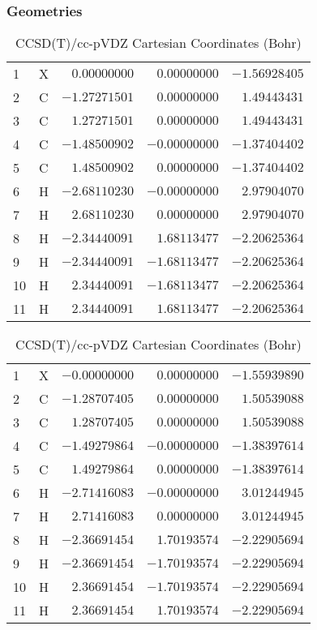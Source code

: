 \documentclass[10pt,oneside]{article}
\begin{document}
\begin{table}[h!]
\subsubsection*{Geometries}
\begin{multicols}{2}
\centering
\caption{CCSD(T)/cc-pVTZ Cartesian Coordinates (Bohr)}
\begin{tabular}{llrrr}
\toprule
1  & X  & $ 0.00000000$ & $ 0.00000000$ & $-1.56928405$ \\
2  & C  & $-1.27271501$ & $ 0.00000000$ & $ 1.49443431$ \\
3  & C  & $ 1.27271501$ & $ 0.00000000$ & $ 1.49443431$ \\
4  & C  & $-1.48500902$ & $-0.00000000$ & $-1.37404402$ \\
5  & C  & $ 1.48500902$ & $ 0.00000000$ & $-1.37404402$ \\
6  & H  & $-2.68110230$ & $-0.00000000$ & $ 2.97904070$ \\
7  & H  & $ 2.68110230$ & $ 0.00000000$ & $ 2.97904070$ \\
8  & H  & $-2.34440091$ & $ 1.68113477$ & $-2.20625364$ \\
9  & H  & $-2.34440091$ & $-1.68113477$ & $-2.20625364$ \\
10 & H  & $ 2.34440091$ & $-1.68113477$ & $-2.20625364$ \\
11 & H  & $ 2.34440091$ & $ 1.68113477$ & $-2.20625364$ \\
\bottomrule
\end{tabular}
\caption{CCSD(T)/cc-pVDZ Cartesian Coordinates (Bohr)}
\begin{tabular}{llrrr}
\toprule
1  & X  & $-0.00000000$ & $ 0.00000000$ & $-1.55939890$ \\
2  & C  & $-1.28707405$ & $ 0.00000000$ & $ 1.50539088$ \\
3  & C  & $ 1.28707405$ & $ 0.00000000$ & $ 1.50539088$ \\
4  & C  & $-1.49279864$ & $-0.00000000$ & $-1.38397614$ \\
5  & C  & $ 1.49279864$ & $ 0.00000000$ & $-1.38397614$ \\
6  & H  & $-2.71416083$ & $-0.00000000$ & $ 3.01244945$ \\
7  & H  & $ 2.71416083$ & $ 0.00000000$ & $ 3.01244945$ \\
8  & H  & $-2.36691454$ & $ 1.70193574$ & $-2.22905694$ \\
9  & H  & $-2.36691454$ & $-1.70193574$ & $-2.22905694$ \\
10 & H  & $ 2.36691454$ & $-1.70193574$ & $-2.22905694$ \\
11 & H  & $ 2.36691454$ & $ 1.70193574$ & $-2.22905694$ \\
\bottomrule
\end{tabular}
\end{multicols}
\end{table}
\end{document}
